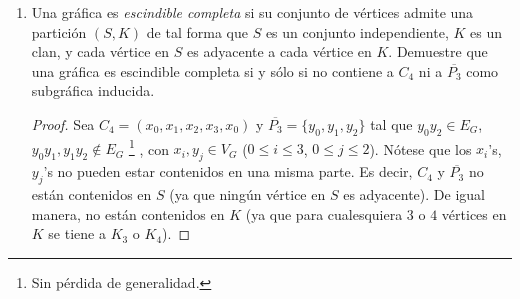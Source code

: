 \documentclass{article}
\begin{document}
\begin{enumerate}
\begin{proof}
\begin{itemize}
          Además, sabemos que el número de componentes conexas aumenta exactamente en
          $1$ en $G -e$ (porque estamos trabajando con gráficas simples). \\
          De esto, se sigue que:
          \begin{eqnarray}
            c(G -e) = c(G) +1\\
            \Rightarrow c(G -e) \leq c(G) +1
          \end{eqnarray}
          De $7$ y $9$ se sigue que:
          \[
          c(G) \le c(G-e) \le c(G) + 1
          \]
        \end{itemize}
        De lo anterior, concluimos que $c(G) \le c(G-e) \le c(G) + 1$. \\
      \end{proof}

  \item Una gr\'afica es \textit{escindible completa} si su conjunto de
    v\'ertices admite una partici\'on $(S,K)$ de tal forma que $S$ es un
    conjunto independiente, $K$ es un clan, y cada v\'ertice en $S$ es adyacente
    a cada v\'ertice en $K$. Demuestre que una gr\'afica es escindible
    completa si y s\'olo si no contiene a $C_4$ ni a $\overline{P_3}$ como
    subgr\'afica inducida. 
    
    \renewcommand\qedsymbol{QED}
    \begin{proof}
      Sea $C_4 = (x_0, x_1, x_2, x_3, x_0)$ y $\overline{P_3} = \{y_0, y_1, y_2\}$
      tal que $y_0 y_2 \in E_G$, $y_0 y_1, y_1 y_2 \notin E_G$ \footnote{Sin pérdida de generalidad.}
      , con $x_i, y_j \in V_G$ ($0 \leq i \leq 3$, $0 \leq j \leq 2$). 
      N\'otese que los $x_i$'s, $y_j$'s no pueden estar contenidos en una misma parte. 
      Es decir, $C_4$ y $\overline{P_3}$ no est\'an contenidos en $S$ (ya que ning\'un
      v\'ertice en $S$ es adyacente). De igual manera, no est\'an contenidos en $K$
      (ya que para cualesquiera $3$ o $4$ v\'ertices en $K$ se tiene a $K_3$ o $K_4$).


\end{proof}
\end{enumerate}
\end{document}
